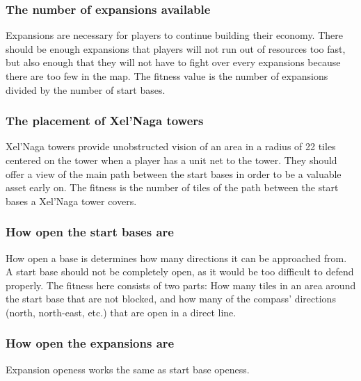 \subsubsection*{The number of expansions available}
Expansions are necessary for players to continue building their economy. There should be enough expansions that players will not run out of resources too fast, but also enough that they will not have to fight over every expansions because there are too few in the map. The fitness value is the number of expansions divided by the number of start bases.

\subsubsection*{The placement of Xel'Naga towers}
Xel'Naga towers provide unobstructed vision of an area in a radius of 22 tiles centered on the tower when a player has a unit net to the tower. They should offer a view of the main path between the start bases in order to be a valuable asset early on. The fitness is the number of tiles of the path between the start bases a Xel'Naga tower covers.

\subsubsection*{How open the start bases are}
How open a base is determines how many directions it can be approached from. A start base should not be completely open, as it would be too difficult to defend properly. The fitness here consists of two parts: How many tiles in an area around the start base that are not blocked, and how many of the compass' directions (north, north-east, etc.) that are open in a direct line.

\subsubsection*{How open the expansions are}
Expansion openess works the same as start base openess.

